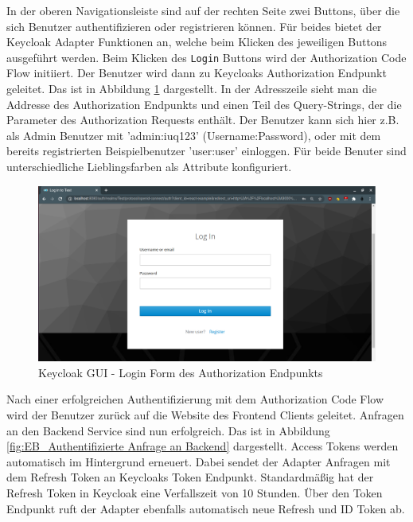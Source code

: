In der oberen Navigationsleiste sind auf der rechten Seite zwei Buttons, über die sich Benutzer authentifizieren oder registrieren können. Für beides bietet der Keycloak Adapter Funktionen an, welche beim Klicken des jeweiligen Buttons ausgeführt werden. Beim Klicken des \texttt{Login} Buttons wird der Authorization Code Flow initiiert. Der Benutzer wird dann zu Keycloaks Authorization Endpunkt geleitet. Das ist in Abbildung \ref{fig:EB_Login Form des Authorization Endpunkts} dargestellt. In der Adresszeile sieht man die Addresse des Authorization Endpunkts und einen Teil des Query-Strings, der die Parameter des Authorization Requests enthält. Der Benutzer kann sich hier z.B. als Admin Benutzer mit 'admin:iuq123' (Username:Password), oder mit dem bereits registrierten Beispielbenutzer 'user:user' einloggen. Für beide Benuter sind unterschiedliche Lieblingsfarben als Attribute konfiguriert.

\begin{figure}[!ht]
	\centering
	\includegraphics[width=1\textwidth]{Images/EbertScherer/FrontendLoginForm.PNG}
	\caption{Keycloak GUI - Login Form des Authorization Endpunkts}
	\label{fig:EB_Login Form des Authorization Endpunkts}
\end{figure}

Nach einer erfolgreichen Authentifizierung mit dem Authorization Code Flow wird der Benutzer zurück auf die Website des Frontend Clients geleitet. Anfragen an den Backend Service sind nun erfolgreich. Das ist in Abbildung \ref{fig:EB_Authentifizierte Anfrage an Backend} dargestellt. Access Tokens werden automatisch im Hintergrund erneuert. Dabei sendet der Adapter Anfragen mit dem Refresh Token an Keycloaks Token Endpunkt. Standardmäßig hat der Refresh Token in Keycloak eine Verfallszeit von 10 Stunden. Über den Token Endpunkt ruft der Adapter ebenfalls automatisch neue Refresh und ID Token ab.

